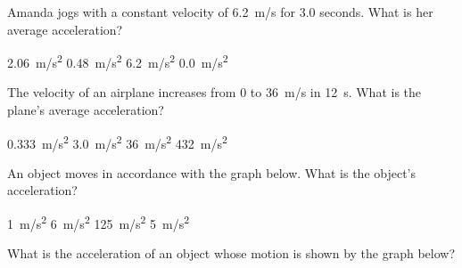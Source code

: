 \documentclass{exam}
\begin{document}
\begin{questions}
\question
Amanda jogs with a constant velocity of \SI{6.2}{m/s} for 3.0 seconds. What is her average acceleration?

\begin{choices}
    \choice \SI{2.06}{m/s^2}
    \choice \SI{0.48}{m/s^2}
    \choice \SI{6.2}{m/s^2}
    \correctchoice \SI{0.0}{m/s^2}
\end{choices}

\question %
The velocity of an airplane increases from 0 to \SI{36}{m/s} in \SI{12}{s}. What is the plane's average acceleration?

\begin{choices}
\choice \SI{0.333}{m/s^2}
\CorrectChoice \SI{3.0}{m/s^2}
\choice \SI{36}{m/s^2}
\choice \SI{432}{m/s^2}
\end{choices}

\question
An object moves in accordance with the graph below. What is the object's acceleration?
\vspace{1em}

\begin{minipage}{0.3\textwidth}
    \begin{choices}
    \choice \SI{1}{m/s^2}
    \choice \SI{6}{m/s^2}
    \choice \SI{125}{m/s^2}
    \CorrectChoice \SI{5}{m/s^2}
    \end{choices}
\end{minipage}%
\begin{minipage}{0.3\textwidth}
\end{minipage}




\question
What is the acceleration of an object whose motion is shown by the graph below?


\end{questions}
\end{document}
